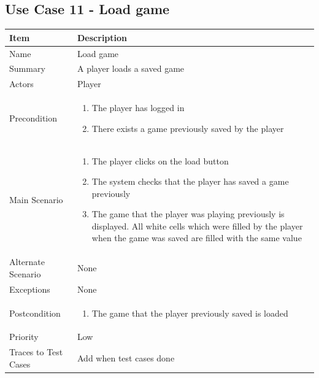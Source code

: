 \documentclass[12pt]{article}
\begin{document}
\newpage


\subsection{Use Case 11 - Load game}

\begin{center}
\setlength{\tabcolsep}{18pt}
\renewcommand{\arraystretch}{1.3}
\begin{tabular}{ |p{3.4cm}|p{10cm}| }
    \hline
   \textbf{Item} & \textbf{Description} \\
    \hline
    Name & Load game \\
    \hline
    Summary & A player loads a saved game \\
    \hline
    Actors & Player \\
    \hline
    Precondition & 
    \vspace*{-0.1in}
    \begin{enumerate}[leftmargin=0.2in]
        \item The player has logged in
        \item There exists a game previously saved by the player
    \end{enumerate}  \\
    \hline
    Main Scenario & 
    \vspace*{-0.1in}
    \begin{enumerate}[leftmargin=0.2in]
    \item The player clicks on the load button 
    \item The system checks that the player has saved a game previously
    \item The game that the player was playing previously is displayed. All white cells which were filled by the player when the game was saved are filled with the same value
    \end{enumerate}  \\
     \hline
    Alternate Scenario & None  \\
    \hline
    Exceptions & None \\
    \hline
    Postcondition & 
    \vspace*{-0.1in}
    \begin{enumerate}[leftmargin=0.2in]
        \item The game that the player previously saved is loaded
    \end{enumerate} \\
    \hline
    Priority & Low \\
    \hline
    \small{Traces to Test Cases} & Add when test cases done  \\
    \hline
\end{tabular}
\end{center}
\end{document}
